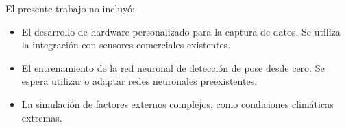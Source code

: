 El presente trabajo no incluyó:
\begin{itemize}
    \item El desarrollo de hardware personalizado para la captura de datos. Se utiliza la
          integración con sensores comerciales existentes.
    \item El entrenamiento de la red neuronal de detección de pose desde cero. Se espera
          utilizar o adaptar redes neuronales preexistentes.
    \item La simulación de factores externos complejos, como condiciones climáticas
          extremas.
\end{itemize}